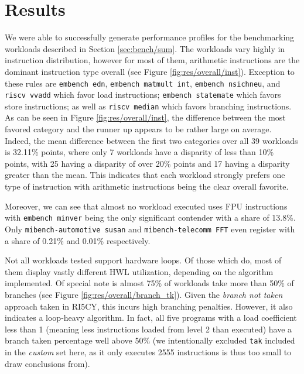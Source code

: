 \documentclass[../bachelor_paper.tex]{subfiles}
\begin{document}
\chapter{Results}
    \label{ch:res}
    
We were able to successfully generate performance profiles for the benchmarking workloads described in Section \ref{sec:bench/sum}. The workloads vary highly in instruction distribution, however for most of them, arithmetic instructions are the dominant instruction type overall (see Figure \ref{fig:res/overall/inst}). Exception to these rules are \texttt{embench edn}, \texttt{embench matmult int}, \texttt{embench nsichneu}, and \texttt{riscv vvadd} which favor load instructions; \texttt{embench statemate} which favors store instructions; as well as \texttt{riscv median} which favors branching instructions. As can be seen in Figure \ref{fig:res/overall/inst}, the difference between the most favored category and the runner up appears to be rather large on average. Indeed, the mean difference between the first two categories over all 39 workloads is 32.11\% points, where only 7 workloads have a disparity of less than 10\% points, with 25 having a disparity of over 20\% points and 17 having a disparity greater than the mean. This indicates that each workload strongly prefers one type of instruction with arithmetic instructions being the clear overall favorite. 

Moreover, we can see that almost no workload executed uses FPU instructions with \texttt{embench minver} being the only significant contender with a share of 13.8\%. Only \texttt{mibench-automotive susan} and \texttt{mibench-telecomm FFT} even register with a share of 0.21\% and 0.01\% respectively.

Not all workloads tested support hardware loops. Of those which do, most of them display vastly different \ac{HWL} utilization, depending on the algorithm implemented. Of special note is almost 75\% of workloads take more than 50\% of branches (see Figure \ref{fig:res/overall/branch_tk}). Given the \emph{branch not taken} approach taken in RI5CY, this incurs high branching penalties. However, it also indicates a loop-heavy algorithm. In fact, all five programs with a load coefficient less than 1 (meaning less instructions loaded from level 2 than executed) have a branch taken percentage well above 50\% (we intentionally excluded \texttt{tak} included in the \emph{custom} set here, as it only executes 2555 instructions is thus too small to draw conclusions from). 
\end{document}

